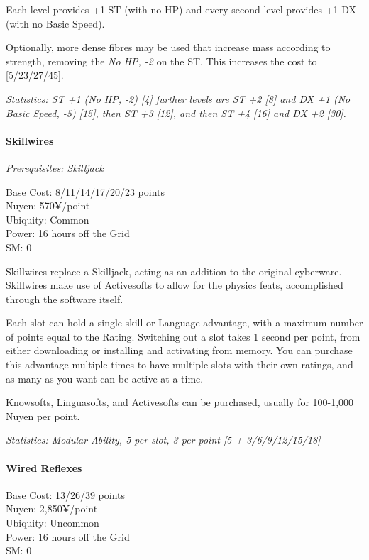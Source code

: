 \begin{multicols*}{3}
	Each level provides +1 ST (with no HP) and every second level provides +1 DX (with no Basic Speed).
	
	Optionally, more dense fibres may be used that increase mass according to strength, removing the \textit{No HP, -2} on the ST. This increases the cost to [5/23/27/45].
	
	\textit{\textcolor{OliveGreen}{Statistics: ST +1 (No HP, -2) [4] further levels are ST +2 [8] and DX +1 (No Basic Speed, -5) [15], then ST +3 [12], and then ST +4 [16] and DX +2 [30].}}
	
	\paragraph{Skillwires}
	\textit{Prerequisites: Skilljack}
	\begin{flushright}
		Base Cost: 8/11/14/17/20/23 points\\
		Nuyen: 570¥/point\\
		Ubiquity: Common\\
		Power: 16 hours off the Grid\\
		SM: 0
	\end{flushright}
	
	Skillwires replace a Skilljack, acting as an addition to the original cyberware. Skillwires make use of Activesofts to allow for the physics feats, accomplished through the software itself. 
	
	Each slot can hold a single skill or Language advantage, with a maximum number of points equal to the Rating. Switching out a slot takes 1 second per point, from either downloading or installing and activating from memory. You can purchase this advantage multiple times to have multiple slots with their own ratings, and as many as you want can be active at a time.
	
	Knowsofts, Linguasofts, and Activesofts can be purchased, usually for 100-1,000 Nuyen per point.
	
	\textit{\textcolor{OliveGreen}{Statistics: Modular Ability, 5 per slot, 3 per point [5 + 3/6/9/12/15/18]}}
	
	\paragraph{Wired Reflexes}
	\begin{flushright}
		Base Cost: 13/26/39 points\\
		Nuyen: 2,850¥/point\\
		Ubiquity: Uncommon\\
		Power: 16 hours off the Grid\\
		SM: 0
	\end{flushright}
	

\end{multicols*}
